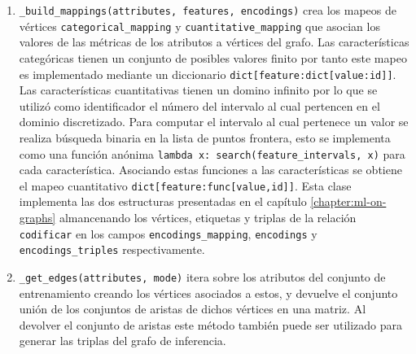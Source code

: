 \begin{enumerate}
    \item \texttt{\_build\_mappings(attributes, features, encodings)} crea los mapeos de v\'ertices \texttt{categorical\_mapping} y \texttt{cuantitative\_mapping}
    que asocian los valores de las m\'etricas de los atributos a v\'ertices del grafo. Las caracter\'isticas
    categ\'oricas tienen un conjunto de posibles valores finito por tanto este mapeo es implementado
    mediante un diccionario \texttt{dict[feature:dict[value:id]]}. Las caracter\'isticas cuantitativas tienen
    un domino infinito por lo que se utiliz\'o como identificador el n\'umero del intervalo al cual pertencen en el dominio
    discretizado. Para computar el intervalo al cual pertenece un valor se realiza b\'usqueda binaria en la
    lista de puntos frontera, esto se implementa como una funci\'on an\'onima \texttt{lambda x: search(feature\_intervals, x)}
    para cada caracter\'istica. Asociando estas funciones a las caracter\'isticas se obtiene el mapeo
    cuantitativo \texttt{dict[feature:func[value,id]]}. Esta clase implementa las dos estructuras
    presentadas en el cap\'itulo \ref{chapter:ml-on-graphs} almancenando los v\'ertices, etiquetas
    y triplas de la relaci\'on \texttt{codificar} en los campos \texttt{encodings\_mapping}, \texttt{encodings} y \texttt{encodings\_triples}
    respectivamente.
    \item \texttt{\_get\_edges(attributes, mode)} itera sobre los atributos del conjunto de entrenamiento
    creando los v\'ertices asociados a estos, y devuelve el conjunto uni\'on de los conjuntos de aristas de dichos v\'ertices en una matriz.
    Al devolver el conjunto de aristas este m\'etodo tambi\'en puede ser utilizado para generar las triplas del grafo de inferencia.
\end{enumerate}


